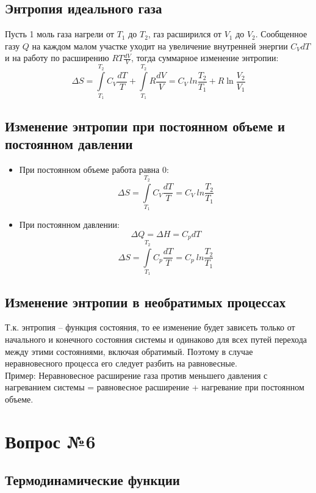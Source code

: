 \documentclass[14pt,a4paper]{scrartcl}
\begin{document}
	\subsection*{Энтропия идеального газа} 
	Пусть 1 моль газа нагрели от $T_1$ до $T_2$, газ расширился от $V_1$ до $V_2$. Сообщенное газу $Q$ на каждом малом участке уходит на увеличение внутренней энергии $C_V dT$ и на работу по расширению $ RT \frac{dV}{V} $, тогда суммарное изменение энтропии:
	\[
	\Delta{S} = \int\limits_{T_1}^{T_2} C_V \dfrac{dT}{T} + \int\limits_{T_1}^{T_2} R \dfrac{dV}{V} = 
	C_V \ ln{\frac{T_2}{T_1}} + R \ln{\frac{V_2}{V_1}} 
	\]
	
	\subsection*{Изменение энтропии при постоянном объеме и постоянном давлении} 
	\begin{itemize}
		\item При постоянном объеме работа равна 0:
		$$ 	\Delta{S} = \int\limits_{T_1}^{T_2} C_V \dfrac{dT}{T} = C_V \ ln{\frac{T_2}{T_1}} $$ 
		\item При постоянном давлении:
		$$ \Delta{Q} = \Delta{H} = C_p dT $$
		$$ \Delta{S} = \int\limits_{T_1}^{T_2} C_p \dfrac{dT}{T} = C_p \ ln{\frac{T_2}{T_1}}  $$
	\end{itemize}
	\subsection*{Изменение энтропии в необратимых процессах} 
	Т.к. энтропия -- функция состояния, то ее изменение будет зависеть только от начального и конечного состояния системы и одинаково для всех путей перехода между этими состояниями, включая обратимый. Поэтому в случае неравновесного процесса его следует разбить на равновесные. \\ 
	Пример: Неравновесное расширение газа против меньшего давления с нагреванием системы = равновесное расширение + нагревание при постоянном объеме.

\section*{Вопрос №6}

	\subsection*{Термодинамические функции} 
	
\end{document}
